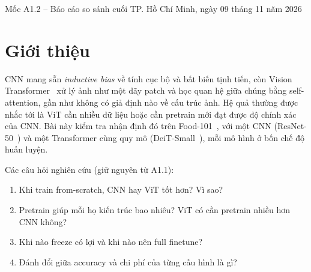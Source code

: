 \documentclass[11pt, a4paper]{article}
\begin{document}
          {Mốc A1.2 -- Báo cáo so sánh cuối}
          {TP. Hồ Chí Minh, ngày 09 tháng 11 năm 2026}

\begin{abstract}
Bài so sánh ResNet-50 (CNN) và DeiT-Small (Transformer), hai mô hình cùng quy mô khoảng 22--24 triệu tham số, trên một subset có kiểm soát của Food-101 (101 lớp; 10.100 ảnh train, 5.050 ảnh test), mỗi mô hình ở bốn chế độ: from-scratch, freeze backbone, freeze một nửa và full finetune. Kết quả tốt nhất là DeiT-S full finetune với 76,20\% top-1, so với 60,44\% của ResNet-50. Pretrain ImageNet là yếu tố quyết định: from-scratch chỉ đạt 17,8\% (ResNet-50) và 11,0\% (DeiT-S). Với DeiT-S, freeze một nửa backbone giữ được 75,39\% top-1 (kém full finetune 0,8 điểm) với một nửa số tham số được train, thời gian train ít hơn 34\% và bộ nhớ GPU bằng khoảng một nửa. Do giới hạn thời gian GPU, quy mô dữ liệu và số epoch nhỏ hơn protocol A1.1; các thay đổi được nêu rõ ở Mục 4.3.
\end{abstract}

\tableofcontents
\newpage

\section{Giới thiệu}

CNN mang sẵn \emph{inductive bias} về tính cục bộ và bất biến tịnh tiến, còn Vision Transformer~\cite{dosovitskiy2021vit} xử lý ảnh như một dãy patch và học quan hệ giữa chúng bằng self-attention, gần như không có giả định nào về cấu trúc ảnh. Hệ quả thường được nhắc tới là ViT cần nhiều dữ liệu hoặc cần pretrain mới đạt được độ chính xác của CNN. Bài này kiểm tra nhận định đó trên Food-101~\cite{bossard2014food}, với một CNN (ResNet-50~\cite{he2016resnet}) và một Transformer cùng quy mô (DeiT-Small~\cite{touvron2021deit}), mỗi mô hình ở bốn chế độ huấn luyện.

Các câu hỏi nghiên cứu (giữ nguyên từ A1.1):
\begin{enumerate}
  \item Khi train from-scratch, CNN hay ViT tốt hơn? Vì sao?
  \item Pretrain giúp mỗi họ kiến trúc bao nhiêu? ViT có cần pretrain nhiều hơn CNN không?
  \item Khi nào freeze có lợi và khi nào nên full finetune?
  \item Đánh đổi giữa accuracy và chi phí của từng cấu hình là gì?
\end{enumerate}
\end{document}
